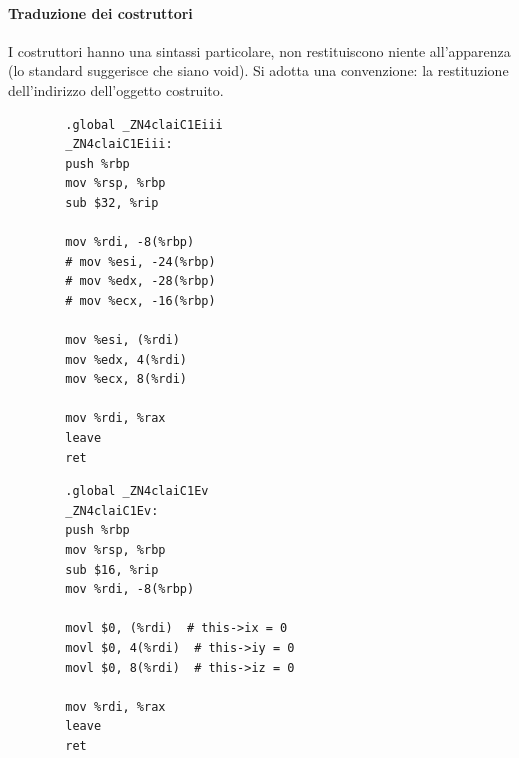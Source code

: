 \paragraph{Traduzione dei costruttori}
I costruttori hanno una sintassi particolare, non restituiscono niente all'apparenza (lo standard suggerisce che siano void). Si adotta una convenzione: la restituzione dell'indirizzo dell'oggetto costruito.
\begin{multicols}{2}
	\begin{verbatim}
		.global _ZN4claiC1Eiii
		_ZN4claiC1Eiii: 
		push %rbp
		mov %rsp, %rbp
		sub $32, %rip
		
		mov %rdi, -8(%rbp)
		# mov %esi, -24(%rbp)
		# mov %edx, -28(%rbp)
		# mov %ecx, -16(%rbp)
		
		mov %esi, (%rdi)
		mov %edx, 4(%rdi)
		mov %ecx, 8(%rdi)
		
		mov %rdi, %rax
		leave
		ret
	\end{verbatim}
	\columnbreak
	\begin{verbatim} 
		.global _ZN4claiC1Ev
		_ZN4claiC1Ev:
		push %rbp
		mov %rsp, %rbp
		sub $16, %rip
		mov %rdi, -8(%rbp)
		
		movl $0, (%rdi)  # this->ix = 0
		movl $0, 4(%rdi)  # this->iy = 0
		movl $0, 8(%rdi)  # this->iz = 0
		
		mov %rdi, %rax
		leave
		ret
	\end{verbatim}
\end{multicols}
